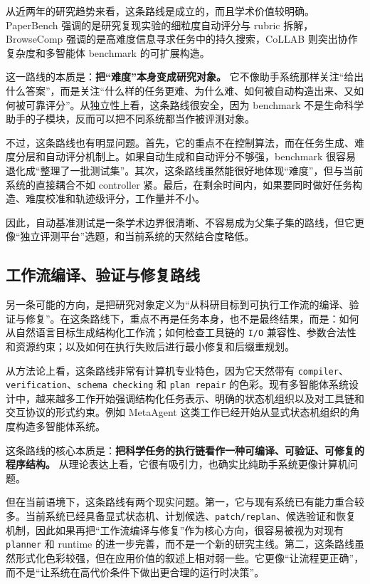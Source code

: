 从近两年的研究趋势来看，这条路线是成立的，而且学术价值较明确。PaperBench\parencite{paperbench} 强调的是研究复现实验的细粒度自动评分与 rubric 拆解，BrowseComp\parencite{browsecomp} 强调的是高难度信息寻求任务中的持久搜索，CoLLAB\parencite{collab} 则突出协作复杂度和多智能体 benchmark 的可扩展构造。

这一路线的本质是：\textbf{把“难度”本身变成研究对象。} 它不像助手系统那样关注“给出什么答案”，而是关注“什么样的任务更难、为什么难、如何被自动构造出来、又如何被可靠评分”。从独立性上看，这条路线很安全，因为 benchmark 不是生命科学助手的子模块，反而可以把不同系统都当作被评测对象。

不过，这条路线也有明显问题。首先，它的重点不在控制算法，而在任务生成、难度分层和自动评分机制上。如果自动生成和自动评分不够强，benchmark 很容易退化成“整理了一批测试集”。其次，这条路线虽然能很好地体现“难度”，但与当前系统的直接耦合不如 controller 紧。最后，在剩余时间内，如果要同时做好任务构造、难度校准和轨迹级评分，工作量并不小。

因此，自动基准测试是一条学术边界很清晰、不容易成为父集子集的路线，但它更像“独立评测平台”选题，和当前系统的天然结合度略低。

\subsection{工作流编译、验证与修复路线}

另一条可能的方向，是把研究对象定义为“从科研目标到可执行工作流的编译、验证与修复”。在这条路线下，重点不再是任务本身，也不是最终结果，而是：如何从自然语言目标生成结构化工作流；如何检查工具链的 \texttt{I/O} 兼容性、参数合法性和资源约束；以及如何在执行失败后进行最小修复和后缀重规划。

从方法论上看，这条路线非常有计算机专业特色，因为它天然带有 \texttt{compiler}、\texttt{verification}、\texttt{schema checking} 和 \texttt{plan repair} 的色彩。现有多智能体系统设计中，越来越多工作开始强调结构化任务表示、明确的状态机组织以及对工具链和交互协议的形式约束。例如 MetaAgent\parencite{metaagent} 这类工作已经开始从显式状态机组织的角度构造多智能体系统。

这条路线的核心本质是：\textbf{把科学任务的执行链看作一种可编译、可验证、可修复的程序结构。} 从理论表达上看，它很有吸引力，也确实比纯助手系统更像计算机问题。

但在当前语境下，这条路线有两个现实问题。第一，它与现有系统已有能力重合较多。当前系统已经具备显式状态机、计划候选、\texttt{patch/replan}、候选验证和恢复机制，因此如果再把“工作流编译与修复”作为核心方向，很容易被视为对现有 \texttt{planner} 和 runtime 的进一步完善，而不是一个新的研究主线。第二，这条路线虽然形式化色彩较强，但在应用价值的叙述上相对弱一些。它更像“让流程更正确”，而不是“让系统在高代价条件下做出更合理的运行时决策”。

